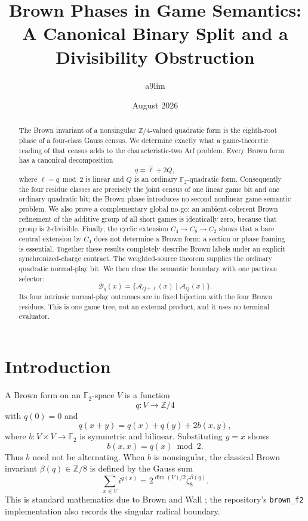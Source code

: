 \documentclass[11pt]{article}
\title{Brown Phases in Game Semantics:\\
A Canonical Binary Split and a Divisibility Obstruction}
\author{a9lim}
\date{August 2026}
\theoremstyle{definition}
\theoremstyle{remark}
\newcommand{\Z}{\mathbb Z}
\newcommand{\F}{\mathbb F}
\begin{document}
\maketitle

\begin{abstract}
The Brown invariant of a nonsingular $\Z/4$-valued quadratic form is the
eighth-root phase of a four-class Gauss census.  We determine exactly what a
game-theoretic reading of that census adds to the characteristic-two Arf
problem.  Every Brown form has a canonical decomposition
\[
 q=\widehat\ell+2Q,
\]
where $\ell=q\bmod2$ is linear and $Q$ is an ordinary $\F_2$-quadratic
form.  Consequently the four residue classes are precisely the joint census
of one linear game bit and one ordinary quadratic bit; the Brown phase
introduces no second nonlinear
game-semantic problem.  We also prove a complementary global no-go: an
ambient-coherent Brown refinement of the additive group of all short games is
identically zero, because that group is $2$-divisible.  Finally, the cyclic
extension $C_4\to C_8\to C_2$ shows that a bare central extension by $C_4$
does not determine a Brown form: a section or phase framing is essential.
Together these results completely describe Brown labels under an explicit
synchronized-charge contract. The weighted-source theorem supplies the
ordinary quadratic normal-play bit. We then close the semantic boundary with
one partizan selector:
\[
  \mathcal B_q(x)=\{\mathcal A_{Q+\ell}(x)\mid\mathcal A_Q(x)\}.
\]
Its four intrinsic normal-play outcomes are in fixed bijection with the four
Brown residues. This is one game tree, not an external product, and it uses no
terminal evaluator.
\end{abstract}

\section{Introduction}

A Brown form on an $\F_2$-space $V$ is a function
\[
 q:V\longrightarrow\Z/4
\]
with $q(0)=0$ and
\begin{equation}\label{eq:brown-law}
 q(x+y)=q(x)+q(y)+2b(x,y),
\end{equation}
where $b:V\times V\to\F_2$ is symmetric and bilinear.  Substituting
$y=x$ shows
\begin{equation}\label{eq:diag}
 b(x,x)=q(x)\bmod2.
\end{equation}
Thus $b$ need not be alternating.  When $b$ is nonsingular, the classical
Brown invariant $\beta(q)\in\Z/8$ is defined by the Gauss sum
\begin{equation}\label{eq:gauss}
 \sum_{x\in V} i^{q(x)}=2^{\dim(V)/2}\zeta_8^{\beta(q)}.
\end{equation}
This is standard mathematics due to Brown and Wall
\cite{brown,wall}; the repository's \texttt{brown\_f2} implementation also
records the singular radical boundary.
\end{document}
